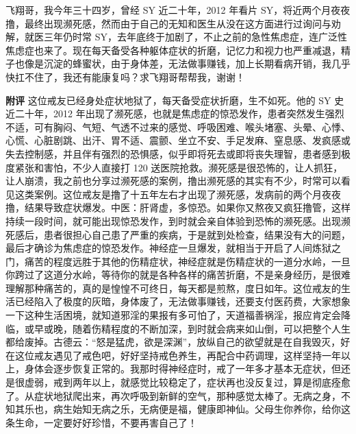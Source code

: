 \begin{case}
    飞翔哥，我今年三十四岁，曾经 SY 近二十年，2012 年看片 SY，将近两个月夜夜撸，最终出现濒死感，然而由于自己的无知和医生从没在这方面进行过询问与劝解，就医三年仍时常 SY，去年底终于加剧了，不止之前的急性焦虑症，连广泛性焦虑症也来了。现在每天备受各种躯体症状的折磨，记忆力和视力也严重减退，精子也像是沉淀的蜂蜜状，由于身体差，无法做事赚钱，加上长期看病开销，我几乎快扛不住了，我还有能康复吗？求飞翔哥帮帮我，谢谢！

    \textbf{附评} 这位戒友已经身处症状地狱了，每天备受症状折磨，生不如死。他的 SY 史近二十年，2012 年出现了濒死感，也就是焦虑症的惊恐发作，患者突然发生强烈不适，可有胸闷、气短、气透不过来的感觉、呼吸困难、喉头堵塞、头晕、心悸、心慌、心脏剧跳、出汗、胃不适、震颤、坐立不安、手足发麻、窒息感、发疯感或失去控制感，并且伴有强烈的恐惧感，似乎即将死去或即将丧失理智，患者感到极度紧张和害怕，不少人直接打 120 送医院抢救。濒死感是很恐怖的，让人抓狂，让人崩溃，我之前也分享过濒死感的案例，撸出濒死感的其实有不少，时常可以看见这类案例。这位戒友是撸了十五年左右才出现了濒死感，发病前的两个月夜夜撸，结果导致症状爆发。中医：肝肾虚，多惊恐。如果你又熬夜又疯狂撸管，这样持续一段时间，就可能出现惊恐发作，到时就会亲自体验到恐怖的濒死感。出现濒死感后，患者很担心自己患了严重的疾病，于是就到处检查，结果没有大的问题，最后才确诊为焦虑症的惊恐发作。神经症一旦爆发，就相当于开启了人间炼狱之门，痛苦的程度远胜于其他的伤精症状，神经症就是伤精症状的一道分水岭，一旦你跨过了这道分水岭，等待你的就是各种各样的痛苦折磨，不是亲身经历，是很难理解那种痛苦的，真的是惶惶不可终日，每天都是煎熬，度日如年。这位戒友的生活已经陷入了极度的灰暗，身体废了，无法做事赚钱，还要支付医药费，大家想象一下这种生活困境，就知道邪淫的果报有多可怕了，天道福善祸淫，报应肯定会降临，或早或晚，随着伤精程度的不断加深，到时就会病来如山倒，可以把整个人生都给废掉。古德云：“怒是猛虎，欲是深渊”，放纵自己的欲望就是在自我毁灭，好在这位戒友遇见了戒色吧，好好坚持戒色养生，再配合中药调理，这样坚持一年以上，身体会逐步恢复正常的。我那时得神经症时，戒了一年多才基本无症状，但还是很虚弱，戒到两年以上，就感觉比较稳定了，症状再也没反复过，算是彻底痊愈了。从症状地狱爬出来，再次呼吸到新鲜的空气，那种感觉太棒了。无病之身，不知其乐也，病生始知无病之乐，无病便是福，健康即神仙。父母生你养你，给你这条生命，一定要好好珍惜，不要再害自己了！
\end{case}

